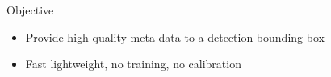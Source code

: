 \documentclass[serif,mathserif,final]{beamer}
\DeclareMathOperator*{\var}{Var} %
\newcommand{\1}{\mathbb{I}} %
\begin{document}
\begin{frame}{}
\begin{columns}[t]
\begin{column}{0.24\linewidth}


      \begin{block}{Objective}
        \begin{itemize}
          \item Provide high quality meta-data to a detection bounding box
          \item Fast lightweight, {\color{red} no training, no calibration}
        \end{itemize}
      \end{block}



    \end{column}%




\end{columns}
\end{frame}
\end{document}
